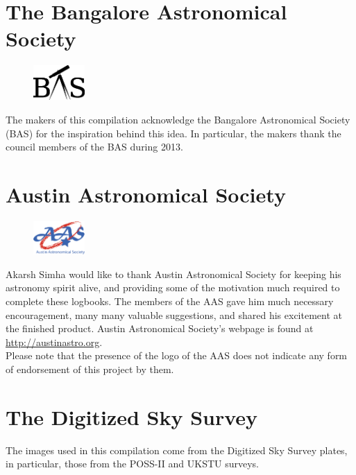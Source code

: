 \section*{The Bangalore Astronomical Society}
\begin{figure}
\vspace{-15pt}
\centering
\includegraphics[width=0.175\textwidth]{BASlogo.eps}
\vspace{-30pt}
\end{figure}
The makers of this compilation acknowledge the Bangalore Astronomical
Society (BAS) for the inspiration behind this idea. In particular, the
makers thank the council members of the BAS during 2013.\\
\vspace{10pt}
\section*{Austin Astronomical Society}
\begin{figure}
\vspace{-15pt}
\centering
\includegraphics[width=0.175\textwidth]{AASlogo.eps}
\vspace{-5pt}
\end{figure}
Akarsh Simha would like to thank Austin Astronomical Society for
keeping his astronomy spirit alive, and providing some of the
motivation much required to complete these logbooks. The members of
the AAS gave him much necessary encouragement, many many valuable
suggestions, and shared his excitement at the finished product. Austin
Astronomical Society's webpage is found at
\url{http://austinastro.org}. \\ 

{\footnotesize Please note that the presence of the logo of the AAS
  does not indicate any form of endorsement of this project by
  them. \\}

\vspace{5pt}

\section*{The Digitized Sky Survey}
The images used in this compilation come from the Digitized Sky Survey
plates, in particular, those from the POSS-II and UKSTU surveys.


